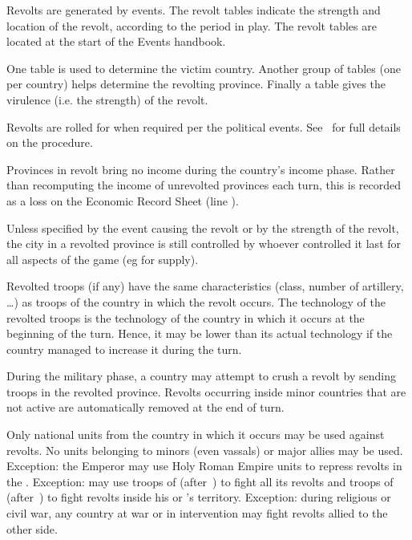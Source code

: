Revolts are generated by events. The revolt tables indicate the strength and
location of the revolt, according to the period in play. The revolt tables are
located at the start of the Events handbook.

One table is used to determine the victim country. Another group of tables
(one per country) helps determine the revolting province. Finally a table
gives the virulence (i.e. the strength) of the revolt.

 Revolts are rolled for when required per the
political events. See~ for full details on the
procedure.

 Provinces in revolt bring no income during the
country's income phase. Rather than recomputing the income of unrevolted
provinces each turn, this is recorded as a loss on the Economic Record Sheet
(line ).

 Unless specified by the event causing the revolt or by
the strength of the revolt, the city in a revolted province is still
controlled by whoever controlled it last for all aspects of the game (eg for
supply).

\aparag[Technology] Revolted troops (if any) have the same characteristics
(class, number of artillery, \ldots) as troops of the country in which the
revolt occurs.
\bparag The technology of the revolted troops is the technology of the country
in which it occurs at the beginning of the turn. Hence, it may be lower than
its actual technology if the country managed to increase it during the turn.

 During the military phase, a country may attempt to
crush a revolt by sending troops in the revolted province.
\bparag Revolts occurring inside minor countries that are not active are
automatically removed at the end of turn.

\aparag Only national units from the country in which it occurs may be used
against revolts. No units belonging to minors (even vassals) or major allies
may be used.
\bparag Exception: the Emperor may use Holy Roman Empire units to repress
revolts in the \HRE.
\bparag Exception: \ANG may use troops of 
(after~) to fight all its revolts and troops of
 (after~) to fight revolts
inside his or 's territory.
\bparag Exception: during religious or civil war, any country at war or in
intervention may fight revolts allied to the other side.

